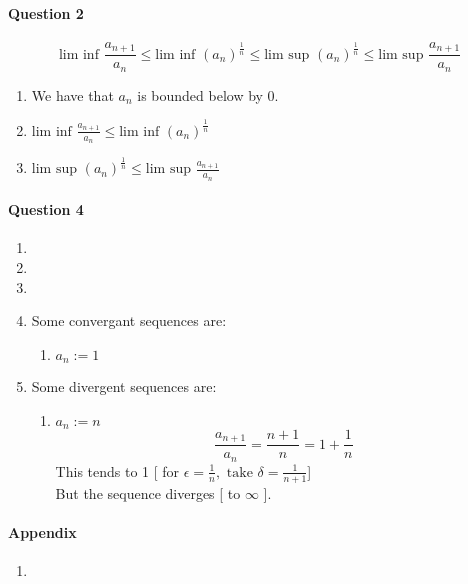 \documentclass[20pt]{extarticle} %
\begin{document}
\paragraph{Question 2}
\[ \text{lim inf } \frac{a_{n+1}}{a_n} \leq \text{lim inf }(a_n)^\frac{1}{n} \leq \text{lim sup }(a_n)^\frac{1}{n} \leq \text{lim sup }\frac{a_{n+1}}{a_n} \]

\begin{enumerate}[label=\Roman*]
	\item	We have that $a_n$ is bounded below by 0.
	\item $\text{lim inf } \frac{a_{n+1}}{a_n} \leq \text{lim inf }(a_n)^\frac{1}{n}$
	\item $\text{lim sup }(a_n)^\frac{1}{n} \leq \text{lim sup }\frac{a_{n+1}}{a_n}$
\end{enumerate}

\paragraph{Question 4}
\begin{enumerate}
	\item
	\item
	\item
	\item Some convergant sequences are:
		\begin{enumerate}
			\item	$a_n:=1$
		\end{enumerate}
	\item Some divergent sequences are: \begin{enumerate}
			\item	$a_n := n$
				\[\frac{  a_{n+1} }{  a_n  }= \frac{n+1}{n}=1+ \frac{1}{n} \]
				This tends to 1 [ for $ \epsilon= \frac{1}{n} , \text{ take } \delta = \frac{1}{n+1}   $]\\
				But the sequence diverges [ to $\infty$  ].
		\end{enumerate}
\end{enumerate}

\paragraph{Appendix}
\begin{enumerate}
	\item {}
\end{enumerate}
\end{document}
